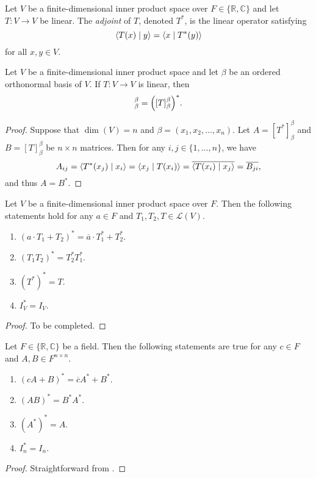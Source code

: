 \begin{definition}
  Let $V$ be a finite-dimensional inner product space over
  $F \in \{\mathbb{R}, \mathbb{C}\}$ and let $T: V \to V$ be linear.
  The \emph{adjoint} of $T$, denoted $T^*$, is the linear operator satisfying
  \begin{equation*}
    \left\langle T(x) \; \middle| \; y \right\rangle = \left\langle x \; \middle| \; T^*(y) \right\rangle
  \end{equation*}
  for all $x, y \in V$.
\end{definition}

\begin{theorem}
  Let $V$ be a finite-dimensional inner product space and let $\beta$ be an
  ordered orthonormal basis of $V$.
  If $T: V \to V$ is linear, then
  \begin{equation*}
    [T^*]_\beta^\beta = \Bigl([T]_\beta^\beta\Bigr)^*.
  \end{equation*}
\end{theorem}
\begin{proof}
  Suppose that $\dim(V) = n$ and $\beta = (x_1, x_2, \dots, x_n)$.
  Let $A = [T^*]_\beta^\beta$ and $B = [T]_\beta^\beta$ be $n \times n$
  matrices.
  Then for any $i, j \in \{1, \dots, n\}$, we have
  \begin{equation*}
    A_{ij}
    = \left\langle T^*(x_j) \; \middle| \; x_i \right\rangle
    = \left\langle x_j \; \middle| \; T(x_i) \right\rangle
    = \overline{\left\langle T(x_i) \; \middle| \; x_j \right\rangle}
    = \overline{B_{ji}},
  \end{equation*}
  and thus $A = B^*$.
\end{proof}

\begin{theorem}
  \label{thm:adjoint-properties}
  Let $V$ be a finite-dimensional inner product space over $F$.
  Then the following statements hold for any $a \in F$ and $T_1, T_2, T \in
  \mathcal{L}(V)$.
  \begin{enumerate}
    \item $(a \cdot T_1 + T_2)^* = \overline{a} \cdot T_1^* + T_2^*$.
    \item $(T_1T_2)^* = T_2^*T_1^*$.
    \item $(T^*)^* = T$.
    \item $I_V^* = I_V$.
  \end{enumerate}
\end{theorem}
\begin{proof}
  To be completed.
\end{proof}

\begin{corollary}
  Let $F \in \{\mathbb{R}, \mathbb{C}\}$ be a field.
  Then the following statements are true for any $c \in F$ and
  $A, B \in F^{n \times n}$.
  \begin{enumerate}
    \item $(cA + B)^* = \overline{c}A^* + B^*$.
    \item $(AB)^* = B^*A^*$.
    \item $(A^*)^* = A$.
    \item $I_n^* = I_n$.
  \end{enumerate}
\end{corollary}
\begin{proof}
  Straightforward from .
\end{proof}


